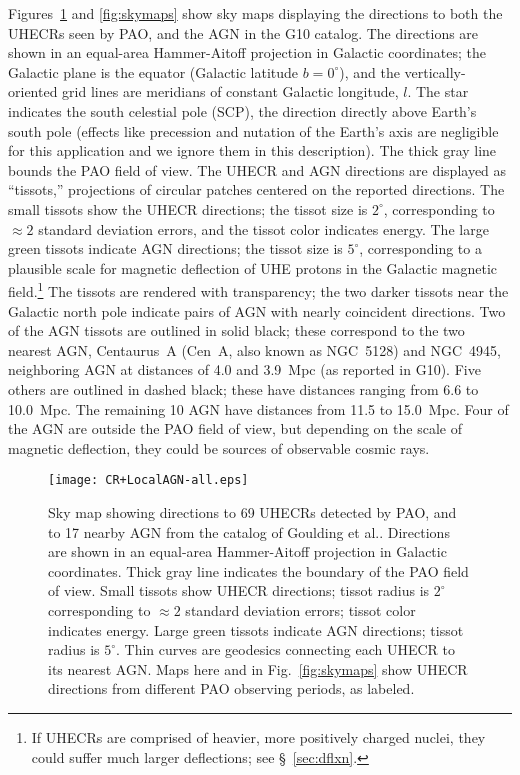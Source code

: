 Figures~\ref{fig:skymap} and \ref{fig:skymaps} show sky maps displaying the
directions to both the UHECRs seen by PAO, and the AGN in the G10 catalog.
The directions are shown in an equal-area Hammer-Aitoff projection in
Galactic coordinates; the Galactic plane is the equator (Galactic latitude
$b=0^\circ$), and the vertically-oriented grid lines are meridians of
constant Galactic longitude, $l$.  The star indicates the south celestial
pole (SCP), the direction directly above Earth's south pole (effects like
precession and nutation of the Earth's axis are negligible for this
application and we ignore them in this description).  The thick gray line
bounds the PAO field of view.  The UHECR and AGN directions are displayed as
``tissots,'' projections of circular patches centered on the reported
directions.  The small tissots show the UHECR directions; the tissot size is
$2^\circ$, corresponding to $\approx 2$ standard deviation errors, and the
tissot color indicates energy.  The large green tissots indicate AGN
directions; the tissot size is $5^\circ$, corresponding to a plausible scale
for magnetic deflection of UHE protons in the Galactic magnetic
field.\footnote{If UHECRs are comprised of heavier, more positively charged
nuclei, they could suffer much larger deflections; see \S~\ref{sec:dflxn}.}
The tissots are rendered with transparency; the two darker tissots near the
Galactic north pole indicate pairs of AGN with nearly coincident directions.
Two of the AGN tissots are outlined in solid black; these correspond to the
two nearest AGN, Centaurus~A (Cen~A, also known as NGC~5128) and NGC~4945,
neighboring AGN at distances of 4.0 and 3.9~Mpc (as reported in G10).  Five
others are outlined in dashed black; these have distances ranging from 6.6
to 10.0~Mpc. The remaining 10 AGN have distances from 11.5 to 15.0~Mpc. 
Four of the AGN are outside the PAO field of view, but depending on the
scale of magnetic deflection, they could be sources of observable cosmic
rays.



\begin{figure}
\begin{centering}
\texttt{[image: CR+LocalAGN-all.eps]}
\end{centering}
\caption{Sky map showing directions to 69 UHECRs detected by PAO, and
to 17 nearby AGN from the catalog of Goulding et al..  Directions are
shown in an equal-area Hammer-Aitoff projection in Galactic coordinates.
Thick gray line indicates the boundary of the PAO field of view.
Small tissots show UHECR directions; tissot radius is $2^\circ$ corresponding
to $\approx 2$ standard deviation errors; tissot color indicates energy.
Large green tissots indicate AGN directions; tissot radius is $5^\circ$.
Thin curves are geodesics connecting each UHECR to its nearest AGN.
Maps here and in Fig.~\ref{fig:skymaps} show UHECR directions from different
PAO observing periods, as labeled.}
\label{fig:skymap}
\end{figure}

